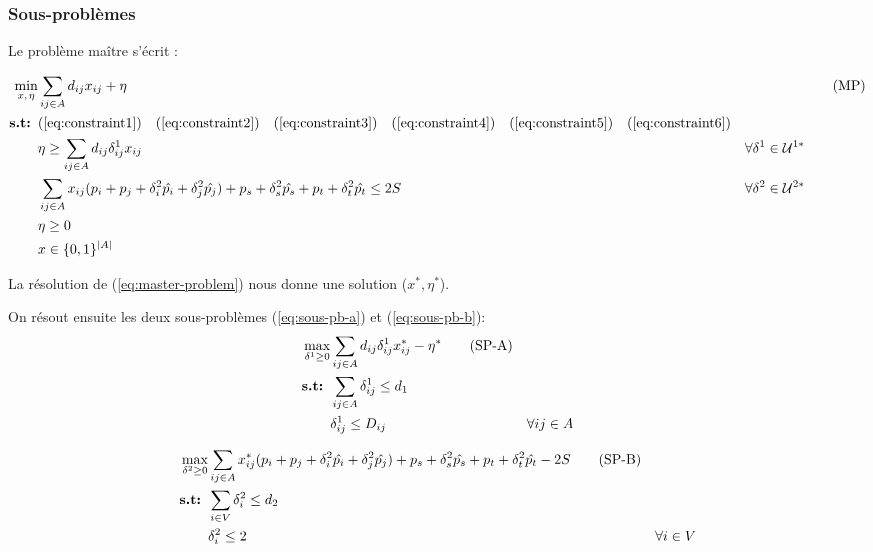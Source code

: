 \documentclass{article}
\begin{document}
\subsubsection{Sous-problèmes}
Le problème maître s'écrit :

\begin{align}
  \min_{x, \hspace{1px} \eta } & \sum_{ij \in A} d_{ij} x_{ij} + \eta && \tag{MP} \label{eq:master-problem} \\
  \textbf{s.t: } & (\ref{eq:constraint1}) \quad (\ref{eq:constraint2}) \quad (\ref{eq:constraint3}) \quad (\ref{eq:constraint4}) \quad (\ref{eq:constraint5}) \quad (\ref{eq:constraint6}) \notag \\
  & \eta \geq \sum_{ij \in A} d_{ij} \delta_{ij}^{1} x_{ij} & \forall \delta^{1} \in \mathcal{U}^{1*} \\
  & \sum_{ij \in A} x_{ij}(p_i + p_j + \delta_{i}^{2} \hat{p_i} + \delta_{j}^{2} \hat{p_j}) + p_s + \delta_{s}^{2} \hat{p_s} + p_t + \delta_{t}^{2} \hat{p_t} \leq 2S & \forall \delta^{2} \in \mathcal{U}^{2*} \\
  & \eta \geq 0 \notag \\
  & x \in \{0,1\}^{|A|} \notag
\end{align}

La résolution de (\ref{eq:master-problem}) nous donne une solution ($x^*, \eta^*$).

On résout ensuite les deux sous-problèmes (\ref{eq:sous-pb-a}) et (\ref{eq:sous-pb-b}): 
\begin{align}
  \max_{\delta^{1} \geq 0} & \sum_{ij \in A} d_{ij} \delta_{ij}^{1} x^*_{ij} - \eta^* \tag{SP-A} \label{eq:sous-pb-a}\\
  \textbf{s.t: } & \sum_{ij \in A} \delta_{ij}^{1} \leq d_1 \notag \\
  &\delta_{ij}^{1} \leq D_{ij} & \forall ij \in A \notag \\
\end{align}

\begin{align}
  \max_{\delta^{2} \geq 0} & \sum_{ij \in A} x^*_{ij}(p_i + p_j + \delta_{i}^{2} \hat{p_i} + \delta_{j}^{2} \hat{p_j}) + p_s + \delta_{s}^{2} \hat{p_s} + p_t + \delta_{t}^{2} \hat{p_t} - 2S \tag{SP-B} \label{eq:sous-pb-b}\\
  \textbf{s.t: } & \sum_{i \in V} \delta^{2}_{i} \leq d_2 \notag \\
  &\delta^{2}_{i} \leq 2 & \forall i \in V \notag
\end{align}
\end{document}
